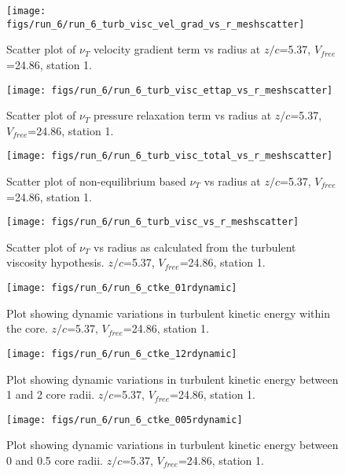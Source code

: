 \begin{figure}[H]
\centering
\texttt{[image: figs/run\_6/run\_6\_turb\_visc\_vel\_grad\_vs\_r\_meshscatter]}
\caption{Scatter plot of $\nu_T$ velocity gradient term vs radius at $z/c$=5.37, $V_{free}$=24.86, station 1.}
\end{figure}


\begin{figure}[H]
\centering
\texttt{[image: figs/run\_6/run\_6\_turb\_visc\_ettap\_vs\_r\_meshscatter]}
\caption{Scatter plot of $\nu_T$ pressure relaxation term vs radius at $z/c$=5.37, $V_{free}$=24.86, station 1.}
\end{figure}


\begin{figure}[H]
\centering
\texttt{[image: figs/run\_6/run\_6\_turb\_visc\_total\_vs\_r\_meshscatter]}
\caption{Scatter plot of non-equilibrium based $\nu_T$ vs radius at $z/c$=5.37, $V_{free}$=24.86, station 1.}
\end{figure}


\begin{figure}[H]
\centering
\texttt{[image: figs/run\_6/run\_6\_turb\_visc\_vs\_r\_meshscatter]}
\caption{Scatter plot of $\nu_T$ vs radius as calculated from the turbulent viscosity hypothesis. $z/c$=5.37, $V_{free}$=24.86, station 1.}
\end{figure}


\begin{figure}[H]
\centering
\texttt{[image: figs/run\_6/run\_6\_ctke\_01rdynamic]}
\caption{Plot showing dynamic variations in turbulent kinetic energy within the core. $z/c$=5.37, $V_{free}$=24.86, station 1.}
\end{figure}


\begin{figure}[H]
\centering
\texttt{[image: figs/run\_6/run\_6\_ctke\_12rdynamic]}
\caption{Plot showing dynamic variations in turbulent kinetic energy between 1 and 2 core radii. $z/c$=5.37, $V_{free}$=24.86, station 1.}
\end{figure}


\begin{figure}[H]
\centering
\texttt{[image: figs/run\_6/run\_6\_ctke\_005rdynamic]}
\caption{Plot showing dynamic variations in turbulent kinetic energy between 0 and 0.5 core radii. $z/c$=5.37, $V_{free}$=24.86, station 1.}
\end{figure}


